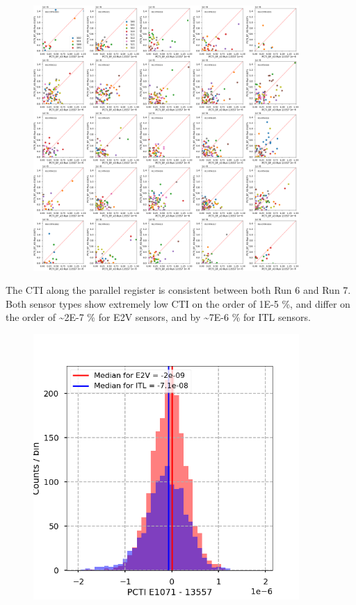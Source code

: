 \begin{figure}
\begin{centering}
\includegraphics[width=0.9\textwidth]{sections/figures/baselineCharacterization/13557_E1071_PCTI_EF_43.png}
\end{centering}
\end{figure}

The CTI along the parallel register is consistent between both Run 6 and
Run 7. Both sensor types show extremely low CTI on the order of 1E-5 \%,
and differ on the order of \textasciitilde2E-7 \% for E2V sensors, and
by \textasciitilde7E-6 \% for ITL sensors.

\begin{figure}
\begin{centering}
\includegraphics[width=0.9\textwidth]{sections/figures/baselineCharacterization/PCTI_13557_E1071_diff.png}
\end{centering}
\end{figure}

